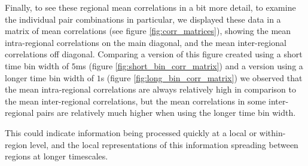   Finally, to see these regional mean correlations in a bit more detail, to examine the individual pair combinations in particular, we displayed these data in a matrix of mean correlations (see figure \ref{fig:corr_matrices}), showing the mean intra-regional correlations on the main diagonal, and the mean inter-regional correlations off diagonal. Comparing a version of this figure created using a short time bin width of $5$ms (figure \ref{fig:short_bin_corr_matrix}) and a version using a longer time bin width of $1$s (figure \ref{fig:long_bin_corr_matrix}) we observed that the mean intra-regional correlations are always relatively high in comparison to the mean inter-regional correlations, but the mean correlations in some inter-regional pairs are relatively much higher when using the longer time bin width.

  This could indicate information being processed quickly at a local or within-region level, and the local representations of this information spreading between regions at longer timescales.

